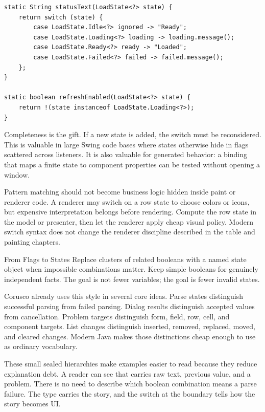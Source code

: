 \begin{lstlisting}[caption={Rendering state without contradictory booleans.}]
static String statusText(LoadState<?> state) {
    return switch (state) {
        case LoadState.Idle<?> ignored -> "Ready";
        case LoadState.Loading<?> loading -> loading.message();
        case LoadState.Ready<?> ready -> "Loaded";
        case LoadState.Failed<?> failed -> failed.message();
    };
}

static boolean refreshEnabled(LoadState<?> state) {
    return !(state instanceof LoadState.Loading<?>);
}
\end{lstlisting}

Completeness is the gift. If a new state is added, the switch must be reconsidered. This is valuable in large Swing code bases where states otherwise hide in flags scattered across listeners. It is also valuable for generated behavior: a binding that maps a finite state to component properties can be tested without opening a window.

Pattern matching should not become business logic hidden inside paint or renderer code. A renderer may switch on a row state to choose colors or icons, but expensive interpretation belongs before rendering. Compute the row state in the model or presenter, then let the renderer apply cheap visual policy. Modern switch syntax does not change the renderer discipline described in the table and painting chapters.

\begin{migrationbox}{From Flags to States}
Replace clusters of related booleans with a named state object when impossible combinations matter. Keep simple booleans for genuinely independent facts. The goal is not fewer variables; the goal is fewer invalid states.
\end{migrationbox}

Corusco already uses this style in several core ideas. Parse states distinguish successful parsing from failed parsing. Dialog results distinguish accepted values from cancellation. Problem targets distinguish form, field, row, cell, and component targets. List changes distinguish inserted, removed, replaced, moved, and cleared changes. Modern Java makes those distinctions cheap enough to use as ordinary vocabulary.

These small sealed hierarchies make examples easier to read because they reduce explanation debt. A reader can see that  carries raw text, previous value, and a problem. There is no need to describe which boolean combination means a parse failure. The type carries the story, and the switch at the boundary tells how the story becomes UI.

